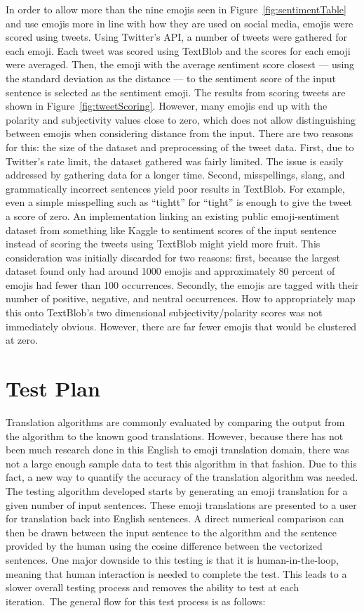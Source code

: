 \documentclass{article}[10]
\begin{document}
In order to allow more than the nine emojis seen in Figure~{\ref{fig:sentimentTable}} and use emojis more in line with how they are used on social media, emojis were scored using tweets. Using Twitter's API, a number of tweets were gathered for each emoji. Each tweet was scored using TextBlob and the scores for each emoji were averaged. Then, the emoji with the average sentiment score closest --- using the standard deviation as the distance --- to the sentiment score of the input sentence is selected as the sentiment emoji. The results from scoring tweets are shown in Figure~\ref{fig:tweetScoring}. However, many emojis end up with the polarity and subjectivity values close to zero, which does not allow distinguishing between emojis when considering distance from the input. There are two reasons for this: the size of the dataset and preprocessing of the tweet data. First, due to Twitter's rate limit, the dataset gathered was fairly limited. The issue is easily addressed by gathering data for a longer time. Second, misspellings, slang, and grammatically incorrect sentences yield poor results in TextBlob. For example, even a simple misspelling such as ``tightt'' for ``tight'' is enough to give the tweet a score of zero. An implementation linking an existing public emoji-sentiment dataset from something  like Kaggle to sentiment scores of the input sentence instead of scoring the tweets using TextBlob might yield more fruit. This consideration was initially discarded for two reasons: first, because the largest dataset found only had around 1000 emojis and approximately 80 percent of emojis had fewer than 100 occurrences. Secondly, the emojis are tagged with their number of positive, negative, and neutral occurrences. How to appropriately map this onto TextBlob's two dimensional subjectivity/polarity scores was not immediately obvious. However, there are far fewer emojis that would be clustered at zero.

\section{Test Plan\label{sec:testPlan}}

Translation algorithms are commonly evaluated by comparing the output from the algorithm to the known good translations. However, because there has not been much research done in this English to emoji translation domain, there was not a large enough sample data to test this algorithm in that fashion. Due to this fact, a new way to quantify the accuracy of the translation algorithm was needed. The testing algorithm developed starts by generating an emoji translation for a given number of input sentences. These emoji translations are presented to a user for translation back into English sentences. A direct numerical comparison can then be drawn between the input sentence to the algorithm and the sentence provided by the human using the cosine difference between the vectorized sentences. One major downside to this testing is that it is human-in-the-loop, meaning that human interaction is needed to complete the test. This leads to a slower overall testing process and removes the ability to test at each iteration.~The general flow for this test process is as follows:
\end{document}
